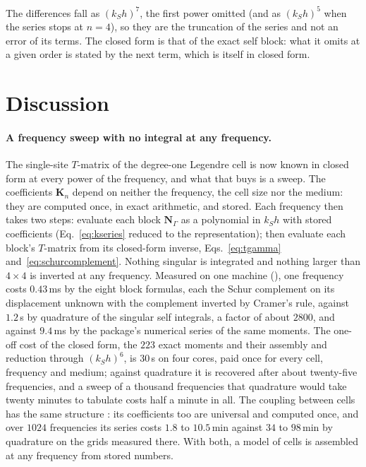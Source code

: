 \documentclass[11pt,a4paper]{article}
\newcommand{\bK}{\mathbf{K}}
\newcommand{\bN}{\mathbf{N}}
\begin{document}
The differences fall as $(k_Sh)^7$, the first power omitted (and as $(k_Sh)^5$ when the series stops at
$n=4$), so they are the truncation of the series and
not an error of its terms. The closed form is that of the exact self block: what it omits at a given order
is stated by the next term, which is itself in closed form.

\section{Discussion}\label{sec:discussion}

\paragraph{A frequency sweep with no integral at any frequency.} The single-site $T$-matrix of the degree-one
Legendre cell is now known in closed form at every power of the frequency, and what that buys is a sweep. The
coefficients $\bK_n$ depend on neither the frequency, the cell size nor the medium: they are computed once,
in exact arithmetic, and stored. Each frequency then takes two steps: evaluate each block $\bN_\Gamma$ as a
polynomial in $k_Sh$ with stored coefficients (Eq.~\eqref{eq:kseries} reduced to the representation); then evaluate each block's $T$-matrix
from its closed-form inverse, Eqs.~\eqref{eq:tgamma} and~\eqref{eq:schurcomplement}. Nothing singular is
integrated and nothing larger than $4\times4$ is inverted at any frequency. Measured on one machine
(), one frequency costs $0.43$\,ms by the eight block formulas,
each the Schur complement on its displacement unknown with the complement inverted by Cramer's rule,
against $1.2$\,s by quadrature of the singular self integrals, a factor of about $2800$, and against
$9.4$\,ms by the package's numerical series of the same moments. The one-off cost of the closed form, the
$223$ exact moments and their assembly and reduction through $(k_Sh)^6$, is $30$\,s on four cores, paid
once for every cell, frequency and medium; against quadrature it is recovered after about twenty-five
frequencies, and a sweep of a thousand frequencies that quadrature would take twenty minutes to tabulate
costs half a minute in all. The coupling between cells has
the same structure \citep{NestorCoupling2026}: its coefficients too are universal and computed once, and over
$1024$ frequencies its series costs $1.8$ to $10.5$\,min against $34$ to $98$\,min by quadrature on the grids
measured there. With both, a model of cells is assembled at any frequency from stored numbers.
\end{document}
